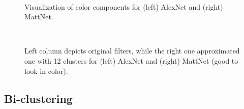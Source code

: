 \begin{figure}[t]
\mbox{
  \quad
{}
}
\label{components}
\caption{Visualization of color components for (left) AlexNet and (right) MattNet.}
\end{figure}


\begin{figure}[t]
\mbox{
  \quad
{}
}
\label{denoising}
\caption{Left column depicts original filters, while the right one approximated one with 12 clusters for (left) AlexNet and (right) MattNet (good to look in color). }
\end{figure}


\subsection{Bi-clustering}

